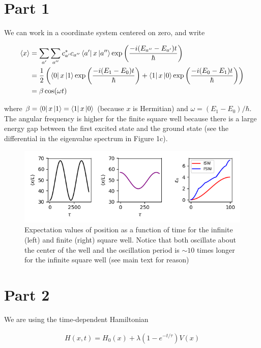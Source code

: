 \documentclass[12pt]{article}
\theoremstyle{definition}
\begin{document}
{\section{Part 1}



We can work in a coordinate system centered on zero, and write

\begin{align*}
\langle x \rangle &= \sum_{a'}\sum_{a''}c_{a'}^{*}c_{a''}\bra{a'}x\ket{a''}\exp\left(\frac{-i(E_{a''}-E_{a'})t}{\hbar}\right)\\
&= \frac{1}{2}\left(\bra{0}x\ket{1}\exp\left(\frac{-i(E_{1}-E_{0})t}{\hbar}\right) + \bra{1}x\ket{0}\exp\left(\frac{-i(E_{0}-E_{1})t}{\hbar}\right)\right)\\
&= \beta \cos(\omega t)
\end{align*}

where $\beta = \bra{0}x\ket{1} = \bra{1}x\ket{0}$ (because $x$ is Hermitian) and $\omega = (E_1-E_0)/\hbar$. The angular frequency is higher for the finite square well because there is a large energy gap between the first excited state and the ground state (see the differential in the eigenvalue spectrum in Figure 1c).

\begin{figure}
\includegraphics[scale=1]{Figure_1.png}
\centering
\caption{Expectation values of position as a function of time for the infinite (left) and finite (right) square well. Notice that both oscillate about the center of the well and the oscillation period is $\sim 10$ times longer for the infinite square well (see main text for reason)}
\end{figure}


\section{Part 2}

We are using the time-dependent Hamiltonian

\begin{align*}
H(x,t) = H_{0}(x) + \lambda(1-e^{-t/\tau})V(x)
\end{align*}

}
\end{document}
